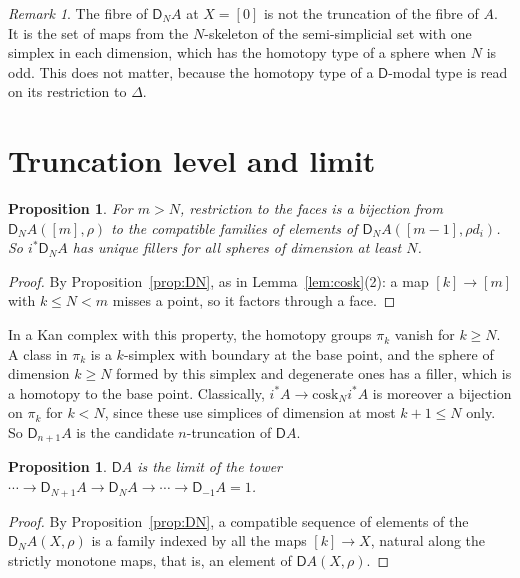 \documentclass[11pt]{article}
\newcommand{\D}{\mathsf{D}}
\newcommand{\cosk}{\mathrm{cosk}}
\theoremstyle{plain}
\newtheorem{proposition}[theorem]{Proposition}
\theoremstyle{definition}
\theoremstyle{remark}
\newtheorem{remark}[theorem]{Remark}
\begin{document}
\begin{remark}
The fibre of $\D_NA$ at $X=[0]$ is not the truncation of the fibre of $A$.
It is the set of maps from the $N$-skeleton of the semi-simplicial set
with one simplex in each dimension, which has the homotopy type of a
sphere when $N$ is odd. This does not matter, because the homotopy type
of a $\D$-modal type is read on its restriction to $\Delta$.
\end{remark}

\section{Truncation level and limit}\label{sec:trunc}

\begin{proposition}\label{prop:cosk}
For $m>N$, restriction to the faces is a bijection from $\D_NA([m],\rho)$ to
the compatible families of elements of $\D_NA([m-1],\rho d_i)$. So
$i^*\D_NA$ has unique fillers for all spheres of dimension at least $N$.
\end{proposition}

\begin{proof}
By Proposition~\ref{prop:DN}, as in Lemma~\ref{lem:cosk}(2): a map
$[k]\to[m]$ with $k\le N<m$ misses a point, so it factors through a face.
\end{proof}

In a Kan complex with this property, the homotopy groups $\pi_k$ vanish
for $k\ge N$. A class in $\pi_k$ is a $k$-simplex with boundary at the base
point, and the sphere of dimension $k\ge N$ formed by this simplex and
degenerate ones has a filler, which is a homotopy to the base point.
Classically, $i^*A\to\cosk_Ni^*A$ is moreover a bijection on $\pi_k$ for
$k<N$, since these use simplices of dimension at most $k+1\le N$ only. So
$\D_{n+1}A$ is the candidate $n$-truncation of $\D A$.

\begin{proposition}\label{prop:lim}
$\D A$ is the limit of the tower $\cdots\to\D_{N+1}A\to\D_NA\to
\cdots\to\D_{-1}A=1$.
\end{proposition}

\begin{proof}
By Proposition~\ref{prop:DN}, a compatible sequence of elements of the
$\D_NA(X,\rho)$ is a family indexed by all the maps $[k]\to X$, natural
along the strictly monotone maps, that is, an element of $\D A(X,\rho)$.

\end{proof}
\end{document}

